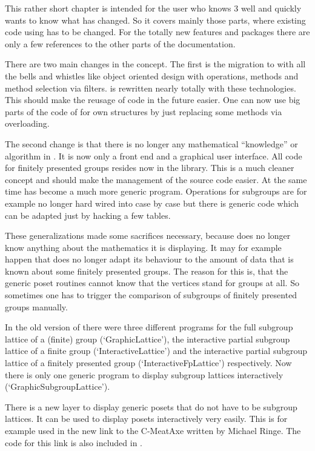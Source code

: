 
This rather short chapter is intended for the user who knows {\XGAP} 3 well
and quickly wants to know what has changed. So it covers mainly those
parts, where existing code using {\XGAP} has to be changed. For the totally 
new features and packages there are only a few references to the other
parts of the documentation.


There are two main changes in the concept. The first is the migration to
{} with all the bells and whistles like object oriented design with
operations, methods and method selection via filters. {} is rewritten 
nearly totally with these technologies. This should make the reusage of
code in the future easier. One can now use big parts of the code of {\XGAP}
for own structures by just replacing some methods via overloading.

The second change is that there is no longer any mathematical ``knowledge''
or algorithm in {\XGAP}. It is now only a front end and a graphical user
interface. All code for finitely presented groups resides now in the {\GAP}
library. This is a much cleaner concept and should make the management of
the source code easier. At the same time {\XGAP} has become a much more
generic program. Operations for subgroups are for example no longer hard
wired into {\XGAP} case by case but there is generic code which can be
adapted just by hacking a few tables.

These generalizations made some sacrifices necessary, because {\XGAP} does
no longer know anything about the mathematics it is displaying. It may for
example happen that {\XGAP} does no longer adapt its behaviour to the
amount of data that is known about some finitely presented groups. The
reason for this is, that the generic poset routines cannot know that the
vertices stand for groups at all. So sometimes one has to trigger the
comparison of subgroups of finitely presented groups manually.

In the old {} version of {\XGAP} there were three different programs
for the full subgroup lattice of a (finite) group (`GraphicLattice'), the
interactive partial subgroup lattice of a finite group
(`InteractiveLattice') and the interactive partial subgroup lattice of a
finitely presented group (`InteractiveFpLattice') respectively. Now there
is only one generic program to display subgroup lattices interactively
(`GraphicSubgroupLattice').

There is a new layer to display generic posets that do not have to be
subgroup lattices. It can be used to display posets interactively very
easily. This is for example used in the new link to the C-MeatAxe written
by Michael Ringe. The code for this link is also included in {}.

